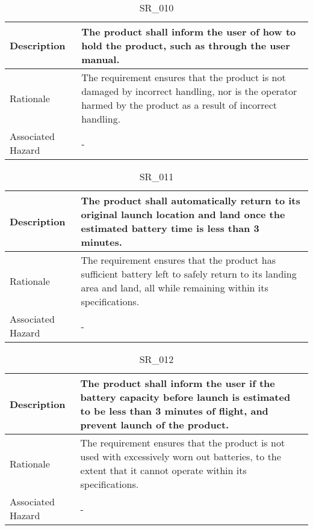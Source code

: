 \documentclass{article}
\begin{document}
\begin{table}[!h]
\begin{center}
\caption {SR\_010} 
\label{SR_010}
\begin{tabular}{ | m{3cm} | m{11cm} | }
\hline
Description & The product shall inform the user of how to hold the product, such as through the user manual. \\
\hline
Rationale & The requirement ensures that the product is not damaged by incorrect handling, nor is the operator harmed by the product as a result of incorrect handling. \\
\hline
Associated Hazard & - \\
\hline
\end{tabular}
\end{center}
\end{table}

\begin{table}[!h]
\begin{center}
\caption {SR\_011} 
\label{SR_011}
\begin{tabular}{ | m{3cm} | m{11cm} | }
\hline
Description & The product shall automatically return to its original launch location and land once the estimated battery time is less than 3 minutes. \\
\hline
Rationale & The requirement ensures that the product has sufficient battery left to safely return to its landing area and land, all while remaining within its specifications. \\
\hline
Associated Hazard & - \\
\hline
\end{tabular}
\end{center}
\end{table}

\begin{table}[!h]
\begin{center}
\caption {SR\_012} 
\label{SR_012}
\begin{tabular}{ | m{3cm} | m{11cm} | }
\hline
Description & The product shall inform the user if the battery capacity before launch is estimated to be less than 3 minutes of flight, and prevent launch of the product. \\
\hline
Rationale & The requirement ensures that the product is not used with excessively worn out batteries, to the extent that it cannot operate within its specifications. \\
\hline
Associated Hazard & - \\
\hline
\end{tabular}
\end{center}
\end{table}
\end{document}
